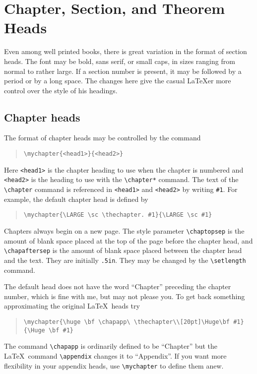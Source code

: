 \section{Chapter, Section, and Theorem Heads}

Even among well printed books, there is great variation in the format
of section heads.  The font may be bold, sans serif, or small caps,
in sizes ranging from normal to rather large.  If a section number is
present, it may be followed by a period or by a long space.  The
changes here give the casual \LaTeX er more control over the style of
his headings.

\subsection{Chapter heads}

The format of chapter heads may be controlled by the command
\begin{quote}
\begin{verbatim}
\mychapter{<head1>}{<head2>}
\end{verbatim}
\end{quote}
Here \verb|<head1>| is the chapter heading to use when the chapter is
numbered and \verb|<head2>| is the heading to use with the
\verb|\chapter*| command.  The text of the \verb|\chapter| command is
referenced in \verb|<head1>| and \verb|<head2>| by writing \verb|#1|.
For example, the default chapter head is defined by
\begin{quote}
\begin{verbatim}
\mychapter{\LARGE \sc \thechapter. #1}{\LARGE \sc #1}
\end{verbatim}
\end{quote}

Chapters always begin on a new page.  The style parameter
\verb|\chaptopsep| is the amount of blank space placed at the top of
the page before the chapter head, and \verb|\chapaftersep| is
the amount of blank space placed between the chapter head and
the text.  They are initially \verb|.5in|.  They may be changed
by the \verb|\setlength| command.

The default head does not have the word ``Chapter'' preceding
the chapter number, which is fine with me, but may not please you.
To get back something approximating the original \LaTeX\ heads
try
\begin{quote}
\begin{verbatim}
\mychapter{\huge \bf \chapapp\ \thechapter\\[20pt]\Huge\bf #1}
{\Huge \bf #1}
\end{verbatim}
\end{quote}
The command \verb|\chapapp| is ordinarily defined to be
``Chapter'' but the \LaTeX\ command \verb|\appendix| changes it
to ``Appendix''.  If you want more flexibility in your appendix
heads, use \verb|\mychapter| to define them anew.


